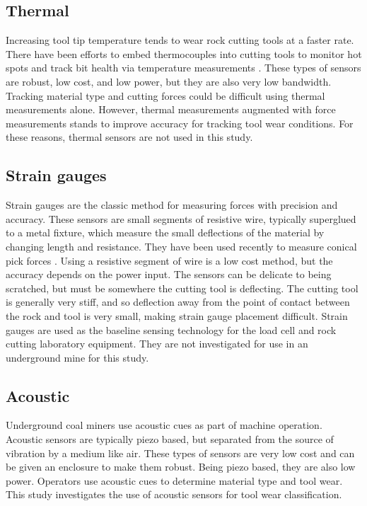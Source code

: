 \subsection{Thermal}
Increasing tool tip temperature tends to wear rock cutting tools at a faster rate.
There have been efforts to embed thermocouples into cutting tools 
to monitor hot spots and track bit health via temperature measurements \cite{SHAO201839}.
These types of sensors are robust, low cost, and low power, but they are also very low bandwidth.
Tracking material type and cutting forces could be difficult using thermal measurements alone.
However, thermal measurements augmented with force measurements stands to improve accuracy for 
tracking tool wear conditions. For these reasons, thermal sensors are not used in this study.

\subsection{Strain gauges}
Strain gauges are the classic method for measuring forces with precision and accuracy.
These sensors are small segments of resistive wire, typically superglued to a metal fixture, 
which measure the small deflections of the material by changing length and resistance.
They have been used recently to measure conical pick forces \cite{s23239521}.
Using a resistive segment of wire is a low cost method, but the accuracy depends on the power input.
The sensors can be delicate to being scratched, but must be somewhere the cutting tool is deflecting.
The cutting tool is generally very stiff, and so deflection away from the point of contact between the rock
and tool is very small, making strain gauge placement difficult.
Strain gauges are used as the baseline sensing technology for the load cell and rock cutting laboratory equipment.
They are not investigated for use in an underground mine for this study.

\subsection{Acoustic}
Underground coal miners use acoustic cues as part of machine operation.
Acoustic sensors are typically piezo based, but separated from the source of vibration by a medium like air.
These types of sensors are very low cost and can be given an enclosure to make them robust. 
Being piezo based, they are also low power. 
Operators use acoustic cues to determine material type and tool wear.
This study investigates the use of acoustic sensors for tool wear classification. 


